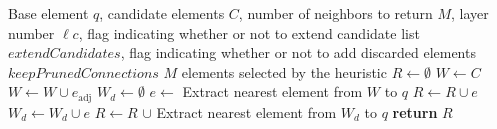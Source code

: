 \begin{algorithm}[H]
\caption{SELECT-NEIGHBORS-HEURISTIC($q$, $C$, $M$, $\ell{c}$, ${extendCandidates}$, ${keepPrunedConnections}$)}\label{alg:nei_heu}
\begin{algorithmic}[1]
\Require Base element $q$, candidate elements $C$, number of neighbors to return $M$, layer number $\ell{c}$, flag indicating whether or not to extend candidate list ${extendCandidates}$, flag indicating whether or not to add discarded elements ${keepPrunedConnections}$
\Ensure $M$ elements selected by the heuristic
\State $R \gets \emptyset$
\State $W \gets C$ 
 
                \State $W \gets W \cup e_{\text{adj}}$
            \EndIf
        \EndFor
    \EndFor
\EndIf
\State $W_d \gets \emptyset$ 
    \State $e \gets$ Extract nearest element from $W$ to $q$
        \State $R \gets R \cup e$
    \Else
        \State $W_d \gets W_d \cup e$
    \EndIf
\EndWhile
{} 
        \State $R \gets R$ $ \cup$ Extract nearest element from $W_d$ to $q$
    \EndWhile
\EndIf
\State \textbf{return} $R$
\end{algorithmic}
\end{algorithm}